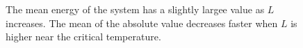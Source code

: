 \documentclass[%
preprint,
 amsmath,amssymb,
 aps,
]{revtex4-1}
\theoremstyle{plain}
\theoremstyle{definition}
\theoremstyle{plain}
\begin{document}
\begin{figure}[h!]
\caption{The mean energy of the system has a slightly largee value as $L$ increases. The mean of the absolute value decreases faster when $L$ is higher near the critical temperature.}
\end{figure}
\end{document}
